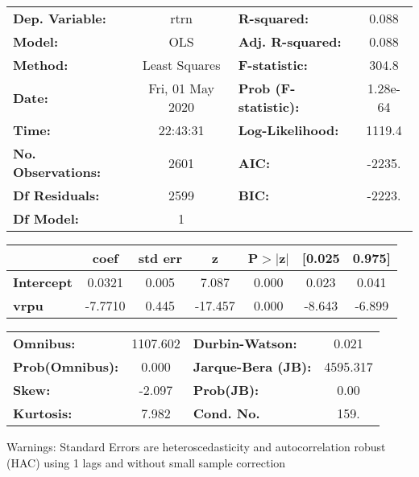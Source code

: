 \begin{center}
\begin{tabular}{lclc}
\toprule
\textbf{Dep. Variable:}    &       rtrn       & \textbf{  R-squared:         } &     0.088   \\
\textbf{Model:}            &       OLS        & \textbf{  Adj. R-squared:    } &     0.088   \\
\textbf{Method:}           &  Least Squares   & \textbf{  F-statistic:       } &     304.8   \\
\textbf{Date:}             & Fri, 01 May 2020 & \textbf{  Prob (F-statistic):} &  1.28e-64   \\
\textbf{Time:}             &     22:43:31     & \textbf{  Log-Likelihood:    } &    1119.4   \\
\textbf{No. Observations:} &        2601      & \textbf{  AIC:               } &    -2235.   \\
\textbf{Df Residuals:}     &        2599      & \textbf{  BIC:               } &    -2223.   \\
\textbf{Df Model:}         &           1      & \textbf{                     } &             \\
\bottomrule
\end{tabular}
\begin{tabular}{lcccccc}
                   & \textbf{coef} & \textbf{std err} & \textbf{z} & \textbf{P$> |$z$|$} & \textbf{[0.025} & \textbf{0.975]}  \\
\midrule
\textbf{Intercept} &       0.0321  &        0.005     &     7.087  &         0.000        &        0.023    &        0.041     \\
\textbf{vrpu}      &      -7.7710  &        0.445     &   -17.457  &         0.000        &       -8.643    &       -6.899     \\
\bottomrule
\end{tabular}
\begin{tabular}{lclc}
\textbf{Omnibus:}       & 1107.602 & \textbf{  Durbin-Watson:     } &    0.021  \\
\textbf{Prob(Omnibus):} &   0.000  & \textbf{  Jarque-Bera (JB):  } & 4595.317  \\
\textbf{Skew:}          &  -2.097  & \textbf{  Prob(JB):          } &     0.00  \\
\textbf{Kurtosis:}      &   7.982  & \textbf{  Cond. No.          } &     159.  \\
\bottomrule
\end{tabular}
\end{center}

Warnings: \newline
 [1] Standard Errors are heteroscedasticity and autocorrelation robust (HAC) using 1 lags and without small sample correction